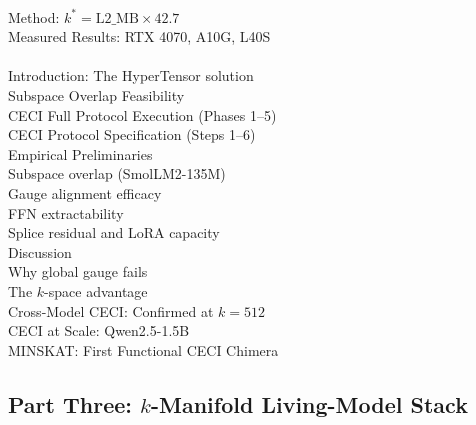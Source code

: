 \documentclass[11pt]{article}
\begin{document}
\vspace{6pt}
\\
\quad Method: $k^* = \mathrm{L2\_MB} \times 42.7$\\
\quad Measured Results: RTX 4070, A10G, L40S\\

\vspace{6pt}
\\
\quad Introduction: The HyperTensor solution\\
\quad Subspace Overlap Feasibility\\
\quad CECI Full Protocol Execution (Phases 1--5)\\
\quad CECI Protocol Specification (Steps 1--6)\\
\quad Empirical Preliminaries\\
\quad \quad Subspace overlap (SmolLM2-135M)\\
\quad \quad Gauge alignment efficacy\\
\quad \quad FFN extractability\\
\quad \quad Splice residual and LoRA capacity\\
\quad Discussion\\
\quad \quad Why global gauge fails\\
\quad \quad The $k$-space advantage\\
\quad Cross-Model CECI: Confirmed at $k=512$\\
\quad \quad CECI at Scale: Qwen2.5-1.5B\\
\quad \quad MINSKAT: First Functional CECI Chimera\\

\subsection*{Part Three: $k$-Manifold Living-Model Stack}
\end{document}
